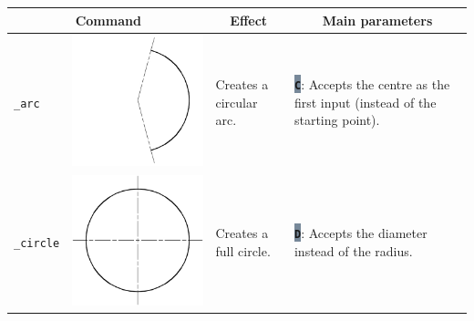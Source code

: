 \documentclass[..]{../IEEEphot}
\newcommand{\param}[1]{\colorbox{LightSlateGray}{\color{Navy}\texttt{\textbf{#1}}}}
\begin{document}
\begin{center}
\begin{longtable}{m{.1\linewidth}m{.2\linewidth}m{.3\linewidth}m{.3\linewidth}}
\toprule
    \multicolumn{2}{c}{\bfseries Command} &
    \multicolumn{1}{c}{\bfseries Effect} &
    \multicolumn{1}{c}{\bfseries Main parameters} \\
\midrule
\texttt{\_arc} & \includegraphics[width = 0.8\linewidth, keepaspectratio]{../images/jpg/_arc.jpg}
& Creates a circular arc. & 
\param{C}: Accepts the centre as the first input (instead of the starting point).
\\			
\midrule
\texttt{\_circle} & \includegraphics[width = 0.8\linewidth, keepaspectratio]{../images/jpg/_circle.jpg} 
& Creates a full circle. & 
\param{D}: Accepts the diameter instead of the radius.


\end{longtable}
\end{center}
\end{document}
